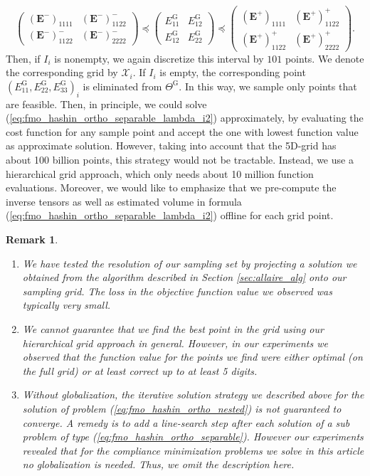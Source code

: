 \documentclass[preprint,3p]{elsarticle}
\newcommand{\tensf}[1]{\bm{\mathbf{#1}}}            %
\newcommand{\Emin}{\tensf{E}^{-}}                   %
\newcommand{\Emax}{\tensf{E}^{+}}                   %
\newtheorem{remark}{Remark}[section]
\begin{document}
%
$$
\begin{pmatrix}
    (\Emin)_{1111} & (\Emin)_{1122}^-\\
    (\Emin)_{1122}^- & (\Emin)_{2222}^-
\end{pmatrix} 
\preceq
\begin{pmatrix}
    E^\mathrm{G}_{11} & E_{12}^\mathrm{G}\\
    E_{12}^\mathrm{G} & E^\mathrm{G}_{22}
\end{pmatrix} 
\preceq
\begin{pmatrix}
    (\Emax)_{1111} & (\Emax)_{1122}^+\\
    (\Emax)_{1122}^+ & (\Emax)_{2222}^+
\end{pmatrix}.
$$
%
Then, if $I_i$ is nonempty, we again discretize this interval by $101$ points. We denote the corresponding grid by $\mathcal{X}_i$. If $I_i$ is empty, the corresponding point $(E^\mathrm{G}_{11},E^\mathrm{G}_{22},E^\mathrm{G}_{33})_i$ is eliminated from $\Theta^\mathrm{G}$. In this way, we sample only points that are feasible. Then, in principle, we could solve (\ref{eq:fmo_hashin_ortho_separable_lambda_i2}) approximately, by evaluating the cost function for any sample point and accept the one with lowest function value as approximate solution. However, taking into account that the 5D-grid has about 100 billion points, this strategy would not be tractable. Instead, we use a hierarchical grid approach, which only needs about 10 million function evaluations. Moreover, we would like to emphasize that we pre-compute the inverse tensors as well as estimated volume in formula (\ref{eq:fmo_hashin_ortho_separable_lambda_i2}) offline for each grid point.

\begin{remark}
\begin{enumerate}
\item We have tested the resolution of our sampling set
by projecting a solution we obtained from the algorithm described in Section \ref{sec:allaire_alg} onto our sampling grid. The loss in the objective function value we observed was typically very small.
%
\item We cannot guarantee that we find the best point in the grid using our hierarchical grid approach in general. However, in our experiments we observed that the function value for the points we find were either optimal (on the full grid) or at least correct up to at least 5 digits. 
%
\item Without globalization, the iterative solution strategy we described above for the solution of problem (\ref{eq:fmo_hashin_ortho_nested}) is not guaranteed to converge. A remedy is to add a line-search step after each solution of a sub problem of type (\ref{eq:fmo_hashin_ortho_separable}). However our experiments revealed that for the compliance minimization problems we solve in this article no globalization is needed. Thus, we omit the description here.
\end{enumerate}
\end{remark}
\end{document}
